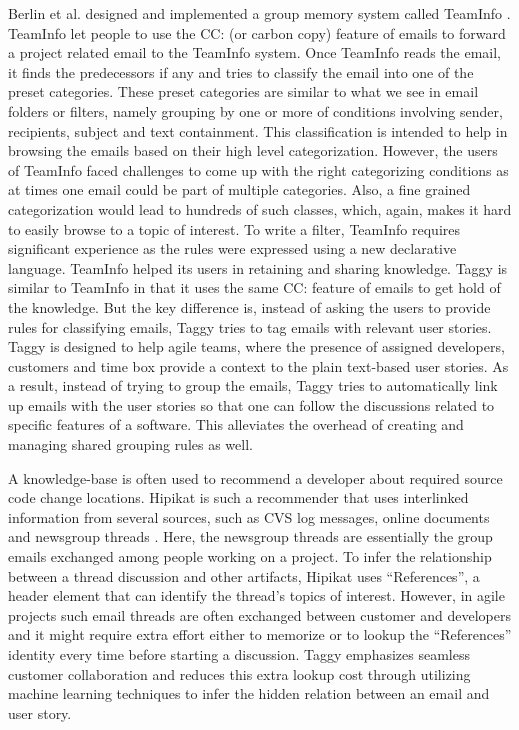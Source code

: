 Berlin et al. designed and implemented a group memory system called TeamInfo \cite{where_did_you}. TeamInfo let people to use the CC: (or carbon copy) feature of emails to forward a project related email to the TeamInfo system. Once TeamInfo reads the email, it finds the predecessors if any and tries to classify the email into one of the preset categories. These preset categories are similar to what we see in email folders or filters, namely grouping by one or more of conditions involving sender, recipients, subject and text containment. This classification is intended to help in browsing the emails based on their high level categorization. However, the users of TeamInfo faced challenges to come up with the right categorizing conditions as at times one email could be part of multiple categories. Also, a fine grained categorization would lead to hundreds of such classes, which, again, makes it hard to easily browse to a topic of interest. To write a filter, TeamInfo requires significant experience as the rules were expressed using a new declarative language. TeamInfo helped its users in retaining and sharing knowledge. Taggy is similar to TeamInfo in that it uses the same CC: feature of emails to get hold of the knowledge. But the key difference is, instead of asking the users to provide rules for classifying emails, Taggy tries to tag emails with relevant user stories. Taggy is designed to help agile teams, where the presence of assigned developers, customers and time box provide a context to the plain text-based user stories. As a result, instead of trying to group the emails, Taggy tries to automatically link up emails with the user stories so that one can follow the discussions related to specific features of a software. This alleviates the overhead of creating and managing shared grouping rules as well.

A knowledge-base is often used to recommend a developer about required source code change locations. Hipikat is such a recommender that uses interlinked information from several sources, such as CVS log messages, online documents and newsgroup threads \cite{hipikat}. Here, the newsgroup threads are essentially the group emails exchanged among people working on a project. To infer the relationship between a thread discussion and other artifacts, Hipikat uses ``References'', a header element that can identify the thread's topics of interest. However, in agile projects such email threads are often exchanged between customer and developers and it might require extra effort either to memorize or to lookup the ``References'' identity every time before starting a discussion. Taggy emphasizes seamless customer collaboration and reduces this extra lookup cost through utilizing machine learning techniques to infer the hidden relation between an email and user story.

